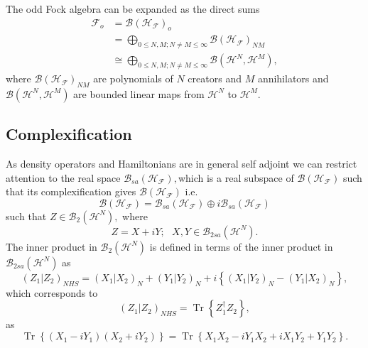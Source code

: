 \documentclass[aps,preprint]{revtex4}%
\begin{document}
The odd Fock algebra can be expanded as the direct sums
\begin{align}
\mathcal{F}_{o}  &  =\mathcal{B}\left(  \mathcal{H}_{\mathcal{F}}\right)
_{o}\nonumber\\
&  =%
{\displaystyle\bigoplus\limits_{0\leq N,M;N\neq M\leq\infty}}
\mathcal{B}\left(  \mathcal{H}_{\mathcal{F}}\right)  _{NM}\\
&  \cong%
{\displaystyle\bigoplus\limits_{0\leq N,M;N\neq M\leq\infty}}
\mathcal{B}\left(  \mathcal{H}^{N},\mathcal{H}^{M}\right)  ,
\end{align}
where $\mathcal{B}\left(  \mathcal{H}_{\mathcal{F}}\right)  _{NM}$ are
polynomials of $N$ creators and $M$ annihilators and $\mathcal{B}\left(
\mathcal{H}^{N},\mathcal{H}^{M}\right)  $ are bounded linear maps from
$\mathcal{H}^{N}$ to $\mathcal{H}^{M}.$

\subsection{Complexification}

As density operators and Hamiltonians are in general self adjoint we can
restrict attention to the real space $\mathcal{B}_{sa}\left(  \mathcal{H}%
_{\mathcal{F}}\right)  ,$which is a real subspace of $\mathcal{B}\left(
\mathcal{H}_{\mathcal{F}}\right)  $ such that its complexification gives
$\mathcal{B}\left(  \mathcal{H}_{\mathcal{F}}\right)  $ i.e.
\begin{equation}
\mathcal{B}\left(  \mathcal{H}_{\mathcal{F}}\right)  =\mathcal{B}_{sa}\left(
\mathcal{H}_{\mathcal{F}}\right)  \oplus i\mathcal{B}_{sa}\left(
\mathcal{H}_{\mathcal{F}}\right)
\end{equation}
such that $Z\in\mathcal{B}_{2}\left(  \mathcal{H}^{N}\right)  ,$ where
\begin{equation}
Z=X+iY;\text{ }X,Y\in\mathcal{B}_{2sa}\left(  \mathcal{H}^{N}\right)  .
\end{equation}
The inner product in $\mathcal{B}_{2}\left(  \mathcal{H}^{N}\right)  $ is
defined in terms of the inner product in $\mathcal{B}_{2sa}\left(
\mathcal{H}^{N}\right)  $ as
\begin{equation}
\left(  Z_{1}\left\vert Z_{2}\right.  \right)  _{NHS}=\left(  X_{1}\left\vert
X_{2}\right.  \right)  _{N}+\left(  Y_{1}\left\vert Y_{2}\right.  \right)
_{N}+i\left\{  \left(  X_{1}\left\vert Y_{2}\right.  \right)  _{N}-\left(
Y_{1}\left\vert X_{2}\right.  \right)  _{N}\right\}  ,
\end{equation}
which corresponds to
\begin{equation}
\left(  Z_{1}\left\vert Z_{2}\right.  \right)  _{NHS}=\operatorname{Tr}%
\left\{  Z_{1}^{\dagger}Z_{2}\right\}  ,
\end{equation}
as%
\begin{equation}
\operatorname{Tr}\left\{  \left(  X_{1}-iY_{1}\right)  \left(  X_{2}%
+iY_{2}\right)  \right\}  =\operatorname{Tr}\left\{  X_{1}X_{2}-iY_{1}%
X_{2}+iX_{1}Y_{2}+Y_{1}Y_{2}\right\}  .
\end{equation}
\end{document}
